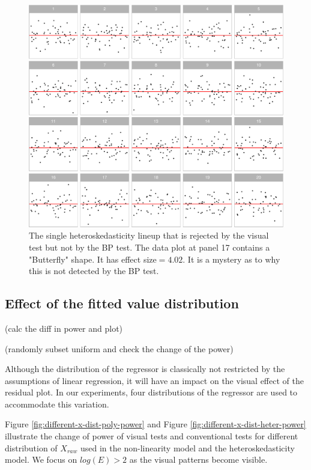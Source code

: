 \documentclass[]{interact}
\theoremstyle{plain}%
\theoremstyle{definition}
\theoremstyle{remark}
\begin{document}
\begin{figure}

{\centering \includegraphics[width=1\linewidth]{paper_comparison_files/figure-latex/heter-example-1} 

}

\caption{The single heteroskedasticity lineup that is rejected by the visual test but not by the BP test. The data plot at panel 17 contains a "Butterfly" shape. It has effect size$ = 4.02$. It is a mystery as to why this is not detected by the BP test.}\label{fig:heter-example}
\end{figure}

\hypertarget{effect-of-the-fitted-value-distribution}{%
\subsection{Effect of the fitted value
distribution}\label{effect-of-the-fitted-value-distribution}}

(calc the diff in power and plot)

(randomly subset uniform and check the change of the power)

Although the distribution of the regressor is classically not restricted
by the assumptions of linear regression, it will have an impact on the
visual effect of the residual plot. In our experiments, four
distributions of the regressor are used to accommodate this variation.

Figure \ref{fig:different-x-dist-poly-power} and Figure
\ref{fig:different-x-dist-heter-power} illustrate the change of power of
visual tests and conventional tests for different distribution of
\(X_{raw}\) used in the non-linearity model and the heteroskedasticity
model. We focus on \(log(E) > 2\) as the visual patterns become visible.
\end{document}
